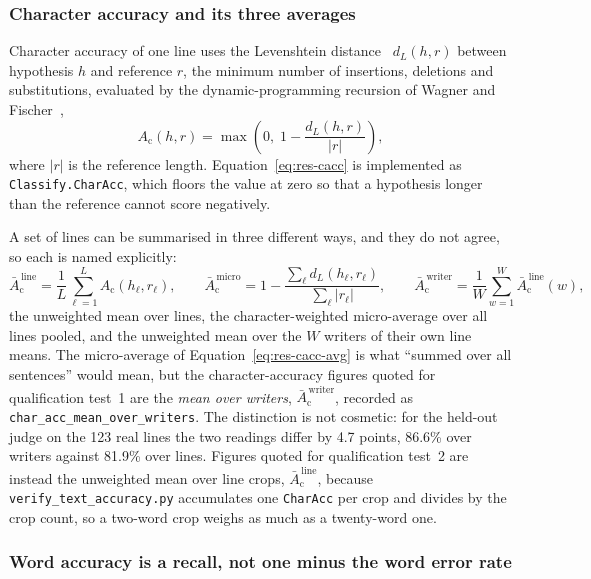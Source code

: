 \subsubsection{Character accuracy and its three averages}

Character accuracy of one line uses the Levenshtein distance~\cite[pp.~707--708]{levenshtein1966} $d_L(h,r)$ between hypothesis $h$ and reference $r$, the minimum number of insertions, deletions and substitutions, evaluated by the dynamic-programming recursion of Wagner and Fischer~\cite{wagner1974},
\begin{equation}
\label{eq:res-cacc}
A_{\mathrm{c}}(h,r)=\max\left(0,\;1-\frac{d_L(h,r)}{\lvert r\rvert}\right),
\end{equation}
where $\lvert r\rvert$ is the reference length.
Equation~\ref{eq:res-cacc} is implemented as \texttt{Classify.CharAcc}, which floors the value at zero so that a hypothesis longer than the reference cannot score negatively.

A set of lines can be summarised in three different ways, and they do not agree, so each is named explicitly:
\begin{equation}
\label{eq:res-cacc-avg}
\bar A_{\mathrm{c}}^{\,\mathrm{line}}=\frac{1}{L}\sum_{\ell=1}^{L}A_{\mathrm{c}}(h_\ell,r_\ell),\qquad
\bar A_{\mathrm{c}}^{\,\mathrm{micro}}=1-\frac{\sum_\ell d_L(h_\ell,r_\ell)}{\sum_\ell\lvert r_\ell\rvert},\qquad
\bar A_{\mathrm{c}}^{\,\mathrm{writer}}=\frac{1}{W}\sum_{w=1}^{W}\bar A_{\mathrm{c}}^{\,\mathrm{line}}(w),
\end{equation}
the unweighted mean over lines, the character-weighted micro-average over all lines pooled, and the unweighted mean over the $W$ writers of their own line means.
The micro-average of Equation~\ref{eq:res-cacc-avg} is what ``summed over all sentences'' would mean, but the character-accuracy figures quoted for qualification test~1 are the \emph{mean over writers}, $\bar A_{\mathrm{c}}^{\,\mathrm{writer}}$, recorded as \texttt{char\_acc\_mean\_over\_writers}.
The distinction is not cosmetic: for the held-out judge on the 123 real lines the two readings differ by 4.7 points, 86.6\% over writers against 81.9\% over lines.
Figures quoted for qualification test~2 are instead the unweighted mean over line crops, $\bar A_{\mathrm{c}}^{\,\mathrm{line}}$, because \texttt{verify\_text\_accuracy.py} accumulates one \texttt{CharAcc} per crop and divides by the crop count, so a two-word crop weighs as much as a twenty-word one.

\subsubsection{Word accuracy is a recall, not one minus the word error rate}

